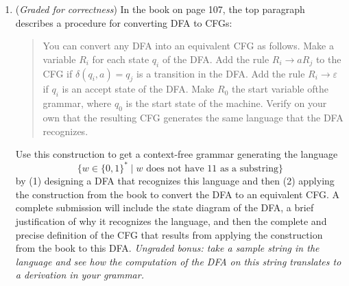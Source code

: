 \documentclass[12pt, oneside]{article}
\newcommand{\gradeCorrect}{({\it Graded for correctness}) }
\begin{document}
\begin{enumerate}[wide, labelwidth=!, labelindent=0pt]
\begin{enumerate}
\item\gradeCorrect In the book on page 107, the top paragraph describes a procedure for converting DFA to CFGs:
\begin{quote}
   You can convert any DFA into an equivalent CFG as follows. 
   Make a variable $R_i$ for each state $q_i$ of the DFA. Add the rule $R_i \to aR_j$ to the
   CFG if $\delta(q_i,a) =q_j$ is a transition in the DFA. Add the rule
   $R_i\to \varepsilon$ if $q_i$ is an accept state of the DFA. Make $R_0$ the start variable ofthe grammar, 
   where $q_0$ is the start state of the machine. Verify on your own that the resulting CFG 
   generates the same language that the DFA recognizes.
\end{quote}

Use this construction to get a context-free grammar generating the language 
\[
    \{ w \in \{0,1\}^* \mid w \text{ does not have $11$ as a substring}\}
\]
by (1) designing a DFA that recognizes this language and then (2) applying the construction from the book to convert the 
DFA to an equivalent CFG. A complete submission will include the state diagram of the DFA, a brief justification of why 
it recognizes the language, and then the complete and precise definition of the CFG that results from applying the construction 
from the book to this DFA. {\it Ungraded bonus: take a sample string in the language and see how the computation of 
the DFA on this string translates to a derivation in your grammar.}

\end{enumerate}


\begin{comment}
For any language $L \subseteq \Sigma^*$, recall that we define its \emph{complement} as 
$$\overline{L} := \Sigma^* - L = \{w \in \Sigma^* \mid w \notin L\}$$ That is, the complement of $L$ 
contains all and only those strings which are not in $L$. Our notation for regular expressions does not 
include the complement symbol. However, 
it turns out that the complement of a language described by a regular expression is guaranteed to also be describable by a 
(different) regular expression. For example, over the alphabet $\Sigma = \{0,1\}$, the complement of the language described 
by the regular expression $\Sigma^* 0$ is described by the regular expression $\varepsilon \cup \Sigma^*1$
because any string that does not end in $0$
must either be the empty string or end in $1$.

For each of the regular expressions $R$ over the alphabet $\Sigma = \{a,b\}$ below, write the regular 
expression for~$\overline{L(R)}$. Your regular expressions may use the symbols
$\varnothing$, $\varepsilon$, $a$, $b$, and the 
following operations to combine them: union, concatenation, 
and Kleene star.


\end{comment}
\end{enumerate}
\end{document}
